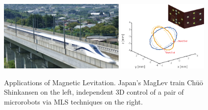 \begin{figure}[H]
    \centering
    \includegraphics[height=130px]{./img/Chuo_Shinkansen.jpg}
    \hspace{1cm}
    \includegraphics[height=130px]{./img/3D_magnetic_dual_control.png}
    \caption{
        Applications of Magnetic Levitation.
        Japan's MagLev train Chūō Shinkansen \cite{WikiSCMaglev} on the left, independent 3D control of a pair of microrobots via MLS techniques \cite{Independent3DControl} on the right.
    }
    \label{fig:mls_applications}
\end{figure}
